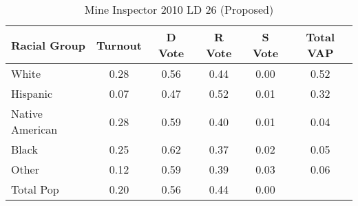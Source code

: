 \begin{table}[htb]
\begin{center}
\caption{Mine Inspector 2010 LD 26 (Proposed)}
\label{smine_vap_ld_26}
\begin{tabular}{lccccc}
  \hline
Racial Group & Turnout & D Vote & R Vote & S Vote & Total VAP \\ 
  \hline
White & 0.28 & 0.56 & 0.44 & 0.00 & 0.52 \\ 
  Hispanic & 0.07 & 0.47 & 0.52 & 0.01 & 0.32 \\ 
  Native American & 0.28 & 0.59 & 0.40 & 0.01 & 0.04 \\ 
  Black & 0.25 & 0.62 & 0.37 & 0.02 & 0.05 \\ 
  Other & 0.12 & 0.59 & 0.39 & 0.03 & 0.06 \\ 
  Total Pop & 0.20 & 0.56 & 0.44 & 0.00 &  \\ 
   \hline
\end{tabular}
\end{center}
\end{table}
